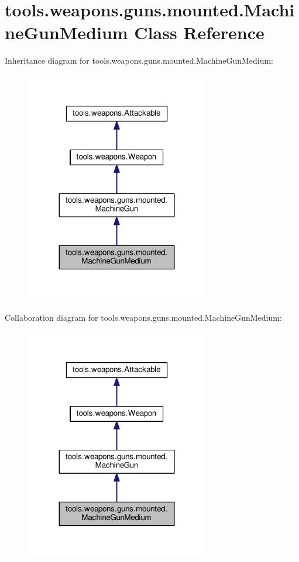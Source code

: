 \hypertarget{classtools_1_1weapons_1_1guns_1_1mounted_1_1_machine_gun_medium}{}\section{tools.\+weapons.\+guns.\+mounted.\+Machine\+Gun\+Medium Class Reference}
\label{classtools_1_1weapons_1_1guns_1_1mounted_1_1_machine_gun_medium}


Inheritance diagram for tools.\+weapons.\+guns.\+mounted.\+Machine\+Gun\+Medium\+:\nopagebreak
\begin{figure}[H]
\begin{center}
\leavevmode
\includegraphics[width=227pt]{classtools_1_1weapons_1_1guns_1_1mounted_1_1_machine_gun_medium__inherit__graph}
\end{center}
\end{figure}


Collaboration diagram for tools.\+weapons.\+guns.\+mounted.\+Machine\+Gun\+Medium\+:\nopagebreak
\begin{figure}[H]
\begin{center}
\leavevmode
\includegraphics[width=227pt]{classtools_1_1weapons_1_1guns_1_1mounted_1_1_machine_gun_medium__coll__graph}
\end{center}
\end{figure}
